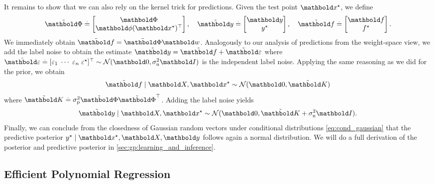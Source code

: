 It remains to show that we can also rely on the kernel trick for predictions.
Given the test point $\vxs$, we define \begin{align*}
  \Tilde{\mPhi} \defeq \begin{bmatrix}
    \mPhi \\
    \transpose{\vphi(\vxs)} \\
  \end{bmatrix}, \quad \Tilde{\vy} \defeq \begin{bmatrix}
    \vy \\
    \ys \\
  \end{bmatrix}, \quad \Tilde{\vf} \defeq \begin{bmatrix}
    \vf \\
    \fs \\
  \end{bmatrix}.
\end{align*}
We immediately obtain $\Tilde{\vf} = \Tilde{\mPhi} \vw$.
Analogously to our analysis of predictions from the weight-space view, we add the label noise to obtain the estimate $\Tilde{\vy} = \Tilde{\vf} + \Tilde{\vvarepsilon}$ where $\Tilde{\vvarepsilon} \defeq \transpose{[\varepsilon_1 \; \cdots \; \varepsilon_n \; \opt{\varepsilon}]} \sim \N{\vzero}{\sigman^2 \mI}$ is the independent label noise.
Applying the same reasoning as we did for the prior, we obtain \begin{align}
  \Tilde{\vf} \mid \mX, \vxs \sim \N{\vzero}{\Tilde{\mK}}
\end{align} where $\Tilde{\mK} \defeq \sigmap^2 \Tilde{\mPhi} \transpose{\Tilde{\mPhi}}$.
Adding the label noise yields \begin{align}
  \Tilde{\vy} \mid \mX, \vxs \sim \N{\vzero}{\Tilde{\mK} + \sigman^2 \mI}.
\end{align}
Finally, we can conclude from the closedness of Gaussian random vectors under conditional distributions \eqref{eq:cond_gaussian} that the predictive posterior ${\ys \mid \vxs, \mX, \vy}$ follows again a normal distribution.
We will do a full derivation of the posterior and predictive posterior in \cref{sec:gp:learning_and_inference}.

\subsection{Efficient Polynomial Regression}

